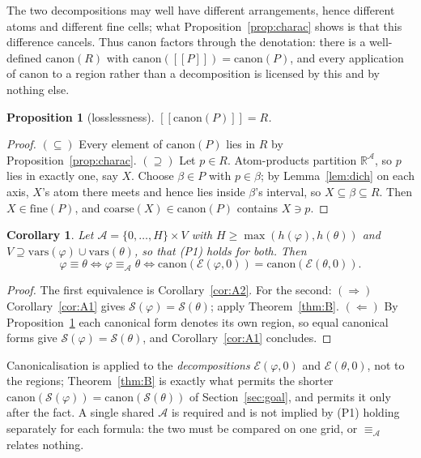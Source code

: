 \documentclass[11pt,a4paper]{article}
\theoremstyle{plain}
\newtheorem{proposition}[theorem]{Proposition}
\newtheorem{corollary}[theorem]{Corollary}
\theoremstyle{definition}
\theoremstyle{remark}
\newcommand{\R}{\mathbb{R}}
\newcommand{\sem}[1]{[\![#1]\!]}
\newcommand{\fine}{\mathrm{fine}}
\newcommand{\can}{\mathrm{canon}}
\newcommand{\Sig}{\mathcal{S}}
\newcommand{\Ax}{\mathcal{A}}
\begin{document}
The two decompositions may well have different arrangements, hence different
atoms and different fine cells; what Proposition~\ref{prop:charac} shows is that
this difference cancels. Thus $\can$ factors through the denotation: there is a
well-defined $\can(R)$ with $\can(\sem{P}) = \can(P)$, and every application of
$\can$ to a region rather than a decomposition is licensed by this and by
nothing else.

\begin{proposition}[losslessness]\label{prop:lossless}
$\sem{\can(P)} = R$.
\end{proposition}

\begin{proof}
$(\subseteq)$ Every element of $\can(P)$ lies in $R$ by
Proposition~\ref{prop:charac}.
$(\supseteq)$ Let $p \in R$. Atom-products partition $\R^{\Ax}$, so $p$ lies in
exactly one, say $X$. Choose $\beta \in P$ with $p \in \beta$; by
Lemma~\ref{lem:dich} on each axis, $X$'s atom there meets and hence lies inside
$\beta$'s interval, so $X \subseteq \beta \subseteq R$. Then $X \in \fine(P)$,
and $\mathrm{coarse}(X) \in \can(P)$ contains $X \ni p$.
\end{proof}

\begin{corollary}\label{cor:B1}
Let $\Ax = \{0,\dots,H\} \times V$ with $H \ge \max(h(\varphi),h(\theta))$ and
$V \supseteq \mathrm{vars}(\varphi) \cup \mathrm{vars}(\theta)$, so that
\textup{(P1)} holds for both. Then
\[
  \varphi \equiv \theta
  \iff \varphi \equiv_{\Ax} \theta
  \iff \can(\mathcal{E}(\varphi,0)) = \can(\mathcal{E}(\theta,0)).
\]
\end{corollary}

\begin{proof}
The first equivalence is Corollary~\ref{cor:A2}. For the second:
$(\Rightarrow)$ Corollary~\ref{cor:A1} gives $\Sig(\varphi) = \Sig(\theta)$;
apply Theorem~\ref{thm:B}. $(\Leftarrow)$ By
Proposition~\ref{prop:lossless} each canonical form denotes its own region, so
equal canonical forms give $\Sig(\varphi) = \Sig(\theta)$, and
Corollary~\ref{cor:A1} concludes.
\end{proof}

Canonicalisation is applied to the \emph{decompositions} $\mathcal{E}(\varphi,0)$
and $\mathcal{E}(\theta,0)$, not to the regions; Theorem~\ref{thm:B} is exactly
what permits the shorter $\can(\Sig(\varphi)) = \can(\Sig(\theta))$ of
Section~\ref{sec:goal}, and permits it only after the fact. A single shared
$\Ax$ is required and is not implied by (P1) holding separately for each formula:
the two must be compared on one grid, or $\equiv_{\Ax}$ relates nothing.
\end{document}
